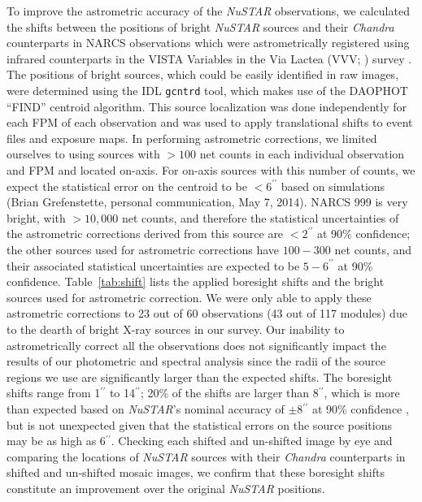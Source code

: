\documentclass[iop,revtex4]{emulateapj}
\begin{document}
To improve the astrometric accuracy of the \textit{NuSTAR} observations, we calculated the shifts between the positions of bright \textit{NuSTAR} sources and their \textit{Chandra} counterparts in NARCS observations which were astrometrically registered using infrared counterparts in the VISTA Variables in the Via Lactea (VVV; \citealt{minniti10}) survey \citep{fornasini14}.  The positions of bright sources, which could be easily identified in raw images, were determined using the IDL \texttt{gcntrd} tool, which makes use of the DAOPHOT ``FIND'' centroid algorithm.  This source localization was done independently for each FPM of each observation and was used to apply translational shifts to event files and exposure maps.  In performing astrometric corrections, we limited ourselves to using sources with $>100$ net counts in each individual observation and FPM and located on-axis.  For on-axis sources with this number of counts, we expect the statistical error on the centroid to be $<6^{\prime\prime}$ based on simulations (Brian Grefenstette, personal communication, May 7, 2014).  NARCS 999 is very bright, with $>10,000$ net counts, and therefore the statistical uncertainties of the astrometric corrections derived from this source are $<2^{\prime\prime}$ at 90\% confidence; the other sources used for astrometric corrections have $100-300$ net counts, and their associated statistical uncertainties are expected to be $5-6^{\prime\prime}$ at 90\% confidence.  Table~\ref{tab:shift} lists the applied boresight shifts and the bright sources used for astrometric correction.  We were only able to apply these astrometric corrections to 23 out of 60 observations (43 out of 117 modules) due to the dearth of bright X-ray sources in our survey.  Our inability to astrometrically correct all the observations does not significantly impact the results of our photometric and spectral analysis since the radii of the source regions we use are significantly larger than the expected shifts.  The boresight shifts range from 1$^{\prime\prime}$ to 14$^{\prime\prime}$; 20\% of the shifts are larger than 8$^{\prime\prime}$, which is more than expected based on \textit{NuSTAR}'s nominal accuracy of $\pm$8$^{\prime\prime}$ at 90\% confidence \citep{harrison13}, but is not unexpected given that the statistical errors on the source positions may be as high as 6$^{\prime\prime}$.  Checking each shifted and un-shifted image by eye and comparing the locations of \textit{NuSTAR} sources with their \textit{Chandra} counterparts in shifted and un-shifted mosaic images, we confirm that these boresight shifts constitute an improvement over the original \textit{NuSTAR} positions.  \par
\end{document}
